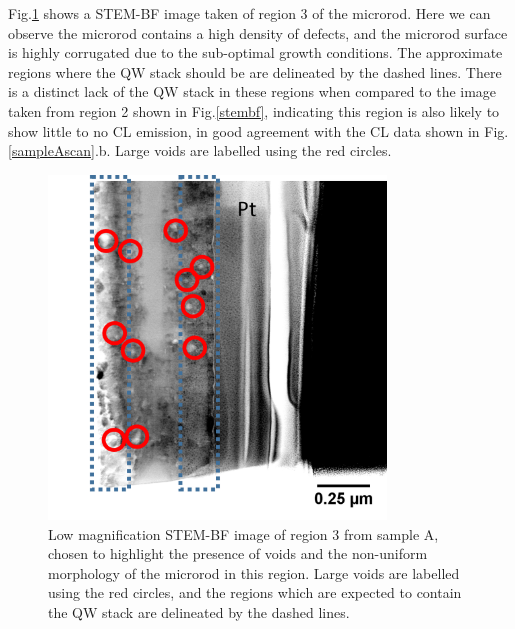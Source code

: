Fig.\ref{region3} shows a STEM-BF image taken of region 3 of the microrod. Here we can observe the microrod contains a high density of defects, and the microrod surface is highly corrugated due to the sub-optimal growth conditions. The approximate regions where the QW stack should be are delineated by the dashed lines. There is a distinct lack of the QW stack in these regions when compared to the image taken from region 2 shown in Fig.\ref{stembf}, indicating this region is also likely to show little to no CL emission, in good agreement with the CL data shown in Fig.\ref{sampleAscan}.b. Large voids are labelled using the red circles. 

\begin{figure}[!h]
	\centering
	\includegraphics[width=0.8\textwidth]{Figs/Ch6/region3}
	\caption{ Low magnification STEM-BF image of region 3 from sample A, chosen to highlight the presence of voids and the non-uniform morphology of the microrod in this region. Large voids are labelled using the red circles, and the regions which are expected to contain the QW stack are delineated by the dashed lines.}
	\label{region3}
\end{figure}
\FloatBarrier

